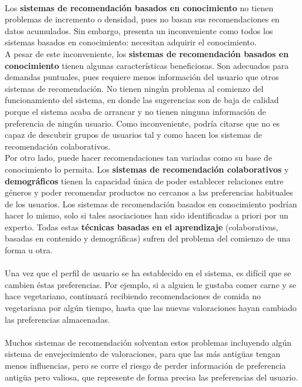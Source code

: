 \documentclass[12pt,letterpaper,oneside] {memoir}
\begin{document}
\paragraph{}
Los \textbf{sistemas de recomendación basados en conocimiento} no tienen problemas de incremento o densidad, pues no basan sus recomendaciones en datos acumulados. Sin embargo, presenta un inconveniente como todos los sistemas basados en conocimiento: necesitan adquirir el conocimiento.\\
A pesar de este inconveniente, los \textbf{sistemas de recomendación basados en conocimiento} tienen algunas características beneficiosas. Son adecuados para demandas puntuales, pues requiere menos información del usuario que otros sistemas de recomendación. No tienen ningún problema al comienzo del funcionamiento del sistema, en donde las sugerencias son de baja de calidad porque el sistema acaba de arrancar y no tienen ninguna información de preferencia de ningún usuario. Como inconveniente, podría citarse que no es capaz de descubrir grupos de usuarios tal y como hacen los sistemas de recomendación colaborativos. \\
Por otro lado, puede hacer recomendaciones tan variadas como su base de conocimiento lo permita. Los \textbf{sistemas de recomendación colaborativos} y \textbf{demográficos} tienen la capacidad única de poder establecer relaciones entre géneros y poder recomendar productos no cercanos a las preferencias habituales de los usuarios. Los sistemas de recomendación basados en conocimiento podrían hacer lo mismo, solo si tales asociaciones han sido identificadas a priori por un experto.
Todas estas \textbf{técnicas basadas en el aprendizaje} (colaborativas, basadas en contenido y demográficas) sufren del problema del comienzo de una forma u otra.
\paragraph{}
Una vez que el perfil de usuario se ha establecido en el sistema, es difícil que se cambien éstas preferencias. Por ejemplo, si a alguien le gustaba comer carne y se hace vegetariano, continuará recibiendo recomendaciones de comida no vegetariana por algún tiempo, hasta que las nuevas valoraciones hayan cambiado las preferencias almacenadas. 
\paragraph{}
Muchos sistemas de recomendación solventan estos problemas incluyendo algún sistema de envejecimiento de valoraciones, para que las más antigüas tengan menos influencias, pero se corre el riesgo de perder información de preferencia antigüa pero valiosa, que represente de forma precisa las preferencias del usuario.  %
\end{document}
